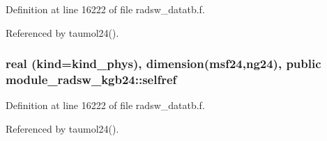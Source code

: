 Definition at line 16222 of file radsw\+\_\+datatb.\+f.



Referenced by taumol24().

\subsubsection[{\texorpdfstring{selfref}{selfref}}]{\setlength{\rightskip}{0pt plus 5cm}real (kind=kind\+\_\+phys), dimension({\bf msf24},ng24), public module\+\_\+radsw\+\_\+kgb24\+::selfref}\hypertarget{namespacemodule__radsw__kgb24_a784e78b5964fadd3e3e1f57f7af30802}{}\label{namespacemodule__radsw__kgb24_a784e78b5964fadd3e3e1f57f7af30802}


Definition at line 16222 of file radsw\+\_\+datatb.\+f.



Referenced by taumol24().

